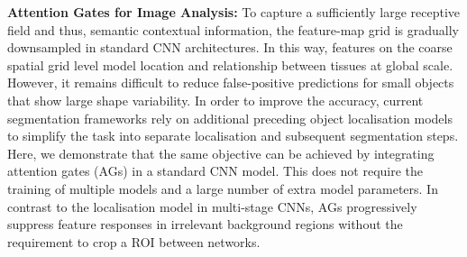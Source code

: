 \documentclass{article}
\begin{document}
\textbf{Attention Gates for Image Analysis:} To capture a sufficiently large receptive field and thus, semantic contextual information, the feature-map grid is gradually downsampled in standard CNN architectures. In this way, features on the coarse spatial grid level model location and relationship between tissues at global scale. However, it remains difficult to reduce false-positive predictions for small objects that show large shape variability. In order to improve the accuracy, current segmentation frameworks \cite{khened2018fully, roth2018media, roth2017hierarchical} rely on additional preceding object localisation models to simplify the task into separate localisation and subsequent segmentation steps. Here, we demonstrate that the same objective can be achieved by integrating attention gates (AGs) in a standard CNN model. This does not require the training of multiple models and a large number of extra model parameters. In contrast to the localisation model in multi-stage CNNs, AGs progressively suppress feature responses in irrelevant background regions without the requirement to crop a ROI between networks.
\end{document}
